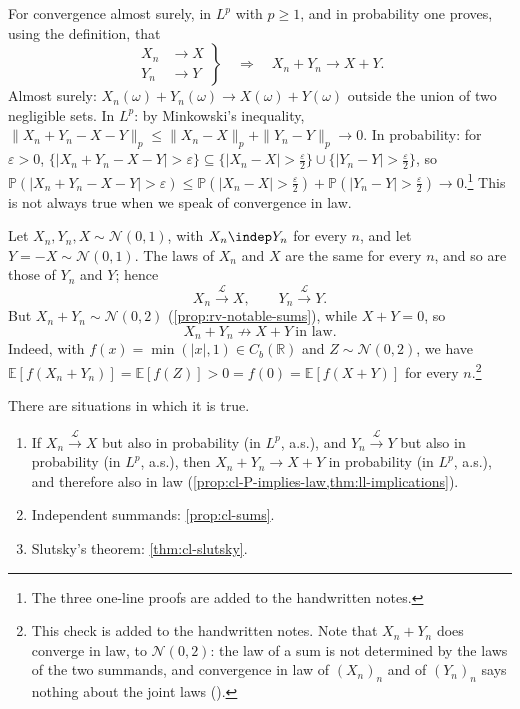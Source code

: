 For convergence almost surely, in $L^p$ with $p\ge1$, and in probability one proves, using the
definition, that
\[
  \left.\begin{aligned}X_n&\to X\\ Y_n&\to Y\end{aligned}\right\}
  \quad\Longrightarrow\quad X_n+Y_n\to X+Y .
\]
Almost surely: $X_n(\omega)+Y_n(\omega)\to X(\omega)+Y(\omega)$ outside the union of two
negligible sets. In $L^p$: by Minkowski's inequality,
$\|X_n+Y_n-X-Y\|_p\le\|X_n-X\|_p+\|Y_n-Y\|_p\to0$. In probability: for $\varepsilon>0$,
$\{|X_n+Y_n-X-Y|>\varepsilon\}\subseteq\{|X_n-X|>\frac\varepsilon2\}\cup\{|Y_n-Y|>\frac\varepsilon2\}$,
so $\mathbb P(|X_n+Y_n-X-Y|>\varepsilon)\le\mathbb P(|X_n-X|>\frac\varepsilon2)+\mathbb
P(|Y_n-Y|>\frac\varepsilon2)\to0$.\footnote{The three one-line proofs are added to the
handwritten notes.} This is not always true when we speak of convergence in law.

\begin{example}\label{exa:cl-sums}
Let $X_n,Y_n,X\sim\mathcal N(0,1)$, with $X_n\indep Y_n$ for every $n$, and let
$Y=-X\sim\mathcal N(0,1)$. The laws of $X_n$ and $X$ are the same for every $n$, and so are
those of $Y_n$ and $Y$; hence
\[
  X_n\xrightarrow{\mathcal L}X,\qquad Y_n\xrightarrow{\mathcal L}Y .
\]
But $X_n+Y_n\sim\mathcal N(0,2)$ (\cref{prop:rv-notable-sums}), while $X+Y=0$, so
\[
  X_n+Y_n\not\to X+Y\ \text{in law}.
\]
Indeed, with $f(x)=\min(|x|,1)\in C_b(\mathbb R)$ and $Z\sim\mathcal N(0,2)$, we have
$\mathbb E[f(X_n+Y_n)]=\mathbb E[f(Z)]>0=f(0)=\mathbb E[f(X+Y)]$ for every $n$.\footnote{This
check is added to the handwritten notes. Note that $X_n+Y_n$ does converge in law, to
$\mathcal N(0,2)$: the law of a sum is not determined by the laws of the two summands, and
convergence in law of $(X_n)_n$ and of $(Y_n)_n$ says nothing about the joint laws
().}
\end{example}

There are situations in which it is true.
\begin{enumerate}[label=(\Alph*)]
  \item If $X_n\xrightarrow{\mathcal L}X$ but also in probability (in $L^p$, a.s.), and
    $Y_n\xrightarrow{\mathcal L}Y$ but also in probability (in $L^p$, a.s.), then
    $X_n+Y_n\to X+Y$ in probability (in $L^p$, a.s.), and therefore also in law
    (\cref{prop:cl-P-implies-law,thm:ll-implications}).
  \item Independent summands: \cref{prop:cl-sums}.
  \item Slutsky's theorem: \cref{thm:cl-slutsky}.
\end{enumerate}

